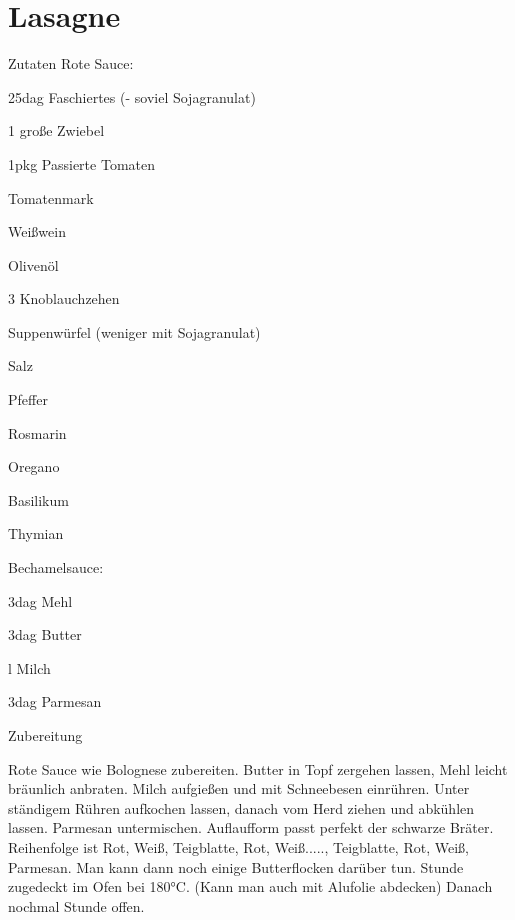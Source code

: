 \chapter*{Lasagne}
\begin{multicols}{2}
 {\Large Zutaten}\newline
 Rote Sauce:
 \begin{Zutaten}
		\item 25dag Faschiertes (- soviel Sojagranulat)
		\item 1 große Zwiebel
		\item 1pkg Passierte Tomaten
		\item Tomatenmark
		\item Weißwein
		\item Olivenöl
		\item 3 Knoblauchzehen
		\item Suppenwürfel (weniger mit Sojagranulat)
		\item Salz
		\item Pfeffer
		\item Rosmarin
		\item Oregano
		\item Basilikum
		\item Thymian
\end{Zutaten}
Bechamelsauce:
\begin{Zutaten}
	\item 3dag Mehl
	\item 3dag Butter
	\item {}l Milch
	\item 3dag Parmesan	
\end{Zutaten}
	
\columnbreak
\end{multicols}

{\Large Zubereitung} \newline
\begin{addmargin}[1cm]{0cm}
	Rote Sauce wie Bolognese zubereiten.\newline
	Butter in Topf zergehen lassen, Mehl leicht bräunlich anbraten.
	Milch aufgießen und mit Schneebesen einrühren.\newline
	Unter ständigem Rühren aufkochen lassen, danach vom Herd ziehen und abkühlen lassen.\newline
	Parmesan untermischen.\newline
	Auflaufform passt perfekt der schwarze Bräter.\newline
	Reihenfolge ist Rot, Weiß, Teigblatte, Rot, Weiß....., Teigblatte, Rot, Weiß, Parmesan.\newline
	Man kann dann noch einige Butterflocken darüber tun.\newline
	 Stunde zugedeckt im Ofen bei 180°C. (Kann man auch mit Alufolie abdecken)
	Danach nochmal  Stunde offen.
	
	
\end{addmargin}
